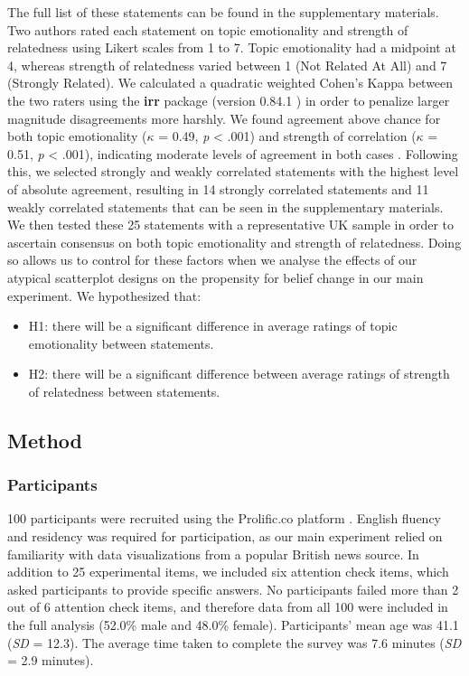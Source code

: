 \documentclass[manuscript,screen,review,anonymous]{acmart}
\providecommand{\tightlist}{%
  \setlength{\itemsep}{0pt}\setlength{\parskip}{0pt}}\usepackage{longtable,booktabs,array}
\begin{document}
The full list of these statements can be found in the supplementary
materials. Two authors rated each statement on topic emotionality and
strength of relatedness using Likert scales from 1 to 7. Topic
emotionality had a midpoint at 4, whereas strength of relatedness varied
between 1 (Not Related At All) and 7 (Strongly Related). We calculated a
quadratic weighted Cohen's Kappa between the two raters using the
\textbf{irr} package (version 0.84.1 \citep{irr}) in order to penalize
larger magnitude disagreements more harshly. We found agreement above
chance for both topic emotionality (\(\kappa\) = 0.49, \emph{p}
\textless{} .001) and strength of correlation (\(\kappa\) = 0.51,
\emph{p} \textless{} .001), indicating moderate levels of agreement in
both cases \citep{cohen_1968, fleiss_1969}. Following this, we selected
strongly and weakly correlated statements with the highest level of
absolute agreement, resulting in 14 strongly correlated statements and
11 weakly correlated statements that can be seen in the supplementary
materials. We then tested these 25 statements with a representative UK
sample in order to ascertain consensus on both topic emotionality and
strength of relatedness. Doing so allows us to control for these factors
when we analyse the effects of our atypical scatterplot designs on the
propensity for belief change in our main experiment. We hypothesized
that:

\begin{itemize}
\tightlist
\item
  H1: there will be a significant difference in average ratings of topic
  emotionality between statements.
\item
  H2: there will be a significant difference between average ratings of
  strength of relatedness between statements.
\end{itemize}

\subsection{Method}\label{sec-method-pre}

\subsubsection{Participants}\label{sec-participants-pre}

100 participants were recruited using the Prolific.co platform
\citep{prolific}. English fluency and residency was required for
participation, as our main experiment relied on familiarity with data
visualizations from a popular British news source. In addition to 25
experimental items, we included six attention check items, which asked
participants to provide specific answers. No participants failed more
than 2 out of 6 attention check items, and therefore data from all 100
were included in the full analysis (52.0\% male and 48.0\% female).
Participants' mean age was 41.1 (\emph{SD} = 12.3). The average time
taken to complete the survey was 7.6 minutes (\emph{SD} = 2.9 minutes).
\end{document}
